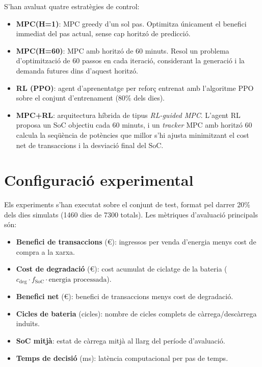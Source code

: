 \documentclass[a4paper,12pt,twoside]{ThesisStyle}
\begin{document}
S'han avaluat quatre estratègies de control:
\begin{itemize}
    \item \textbf{MPC(H=1)}: MPC greedy d'un sol pas. Optimitza únicament el benefici immediat del pas actual, sense cap horitzó de predicció.
    \item \textbf{MPC(H=60)}: MPC amb horitzó de 60 minuts. Resol un problema d'optimització de 60 passos en cada iteració, considerant la generació i la demanda futures dins d'aquest horitzó.
    \item \textbf{RL (PPO)}: agent d'aprenentatge per reforç entrenat amb l'algoritme PPO sobre el conjunt d'entrenament (80\% dels dies).
    \item \textbf{MPC+RL}: arquitectura híbrida de tipus \textit{RL-guided MPC}. L'agent RL proposa un SoC objectiu cada 60 minuts, i un \textit{tracker} MPC amb horitzó 60 calcula la seqüència de potències que millor s'hi ajusta minimitzant el cost net de transaccions i la desviació final del SoC.
\end{itemize}

\section{Configuració experimental}

Els experiments s'han executat sobre el conjunt de test, format pel darrer 20\% dels dies simulats (1460 dies de 7300 totals). Les mètriques d'avaluació principals són:

\begin{itemize}
    \item \textbf{Benefici de transaccions} (€): ingressos per venda d'energia menys cost de compra a la xarxa.
    \item \textbf{Cost de degradació} (€): cost acumulat de ciclatge de la bateria ($c_{\mathrm{deg}} \cdot f_{\mathrm{SoC}} \cdot \text{energia processada}$).
    \item \textbf{Benefici net} (€): benefici de transaccions menys cost de degradació.
    \item \textbf{Cicles de bateria} (cicles): nombre de cicles complets de càrrega/descàrrega induïts.
    \item \textbf{SoC mitjà}: estat de càrrega mitjà al llarg del període d'avaluació.
    \item \textbf{Temps de decisió} (ms): latència computacional per pas de temps.
\end{itemize}
\end{document}
